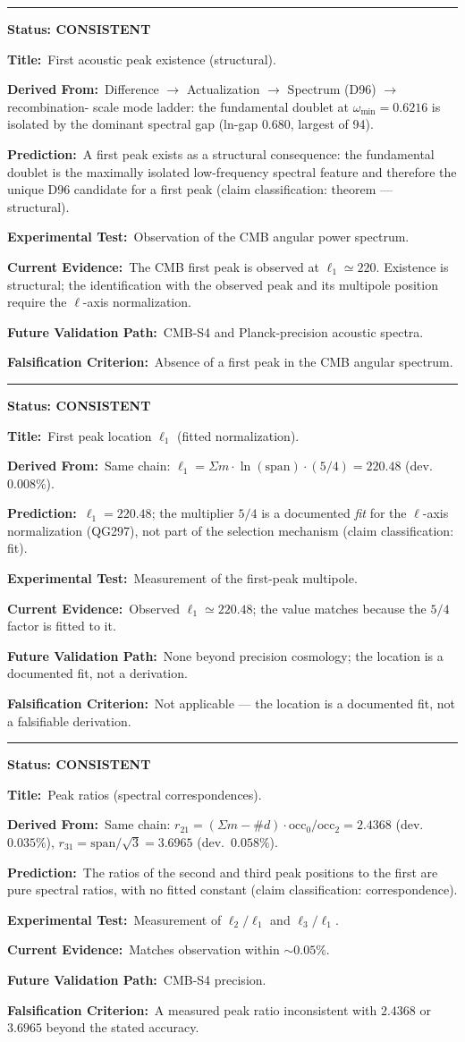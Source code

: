 \documentclass[11pt,a4paper]{article}
\newcommand{\predstart}[2]{%
  \par\medskip\noindent\hrule\par\smallskip
  \noindent{\large\bfseries #1}\hfill{\bfseries Status: #2}\par\smallskip
}
\newcommand{\pfield}[2]{%
  \noindent\textbf{#1:}~#2\par\smallskip
}
\begin{document}
\predstart{AT-P026}{CONSISTENT}
\pfield{Title}{First acoustic peak existence (structural).}
\pfield{Derived From}{Difference $\to$ Actualization $\to$ Spectrum (D96) $\to$ recombination-
scale mode ladder: the fundamental doublet at $\omega_{\min} = 0.6216$ is isolated by the
dominant spectral gap (ln-gap $0.680$, largest of 94).}
\pfield{Prediction}{A first peak exists as a structural consequence: the fundamental doublet
is the maximally isolated low-frequency spectral feature and therefore the unique D96
candidate for a first peak (claim classification: theorem --- structural).}
\pfield{Experimental Test}{Observation of the CMB angular power spectrum.}
\pfield{Current Evidence}{The CMB first peak is observed at $\ell_1 \simeq 220$. Existence is
structural; the identification with the observed peak and its multipole position require
the $\ell$-axis normalization.}
\pfield{Future Validation Path}{CMB-S4 and Planck-precision acoustic spectra.}
\pfield{Falsification Criterion}{Absence of a first peak in the CMB angular spectrum.}

\predstart{AT-P027}{CONSISTENT}
\pfield{Title}{First peak location $\ell_1$ (fitted normalization).}
\pfield{Derived From}{Same chain: $\ell_1 = \Sigma m\cdot\ln(\mathrm{span})\cdot(5/4) =
220.48$ (dev.\ $0.008\%$).}
\pfield{Prediction}{$\ell_1 = 220.48$; the multiplier $5/4$ is a documented \emph{fit} for the
$\ell$-axis normalization (QG297), not part of the selection mechanism
(claim classification: fit).}
\pfield{Experimental Test}{Measurement of the first-peak multipole.}
\pfield{Current Evidence}{Observed $\ell_1 \simeq 220.48$; the value matches because the
$5/4$ factor is fitted to it.}
\pfield{Future Validation Path}{None beyond precision cosmology; the location is a documented
fit, not a derivation.}
\pfield{Falsification Criterion}{Not applicable --- the location is a documented fit, not a
falsifiable derivation.}

\predstart{AT-P028}{CONSISTENT}
\pfield{Title}{Peak ratios (spectral correspondences).}
\pfield{Derived From}{Same chain: $r_{21} = (\Sigma m-\#d)\cdot\mathrm{occ}_0/\mathrm{occ}_2 =
2.4368$ (dev.\ $0.035\%$), $r_{31} = \mathrm{span}/\sqrt{3} = 3.6965$ (dev.\ $0.058\%$).}
\pfield{Prediction}{The ratios of the second and third peak positions to the first are pure
spectral ratios, with no fitted constant (claim classification: correspondence).}
\pfield{Experimental Test}{Measurement of $\ell_2/\ell_1$ and $\ell_3/\ell_1$.}
\pfield{Current Evidence}{Matches observation within $\sim0.05\%$.}
\pfield{Future Validation Path}{CMB-S4 precision.}
\pfield{Falsification Criterion}{A measured peak ratio inconsistent with $2.4368$ or $3.6965$
beyond the stated accuracy.}
\end{document}
